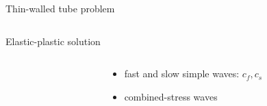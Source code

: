 \begin{frame}{Thin-walled tube problem}
\begin{columns}
\begin{column}{0.52\textwidth}
\begin{footnotesize}
\begin{block}{\footnotesize Elastic-\alert{plastic} solution \cite{CRISTESCU19591605,Rakhmatulin}}
\begin{columns}
\begin{column}{0.25\textwidth}
            \end{column}
            \begin{column}{0.7\textwidth}
              \begin{itemize}
              \item[] fast and slow simple waves: $c_f,c_s$
              \item[] combined-stress waves
              \end{itemize}
            \end{column}
          \end{columns}
        \end{block}
      \end{footnotesize}
    \end{column}
  \end{columns}
\end{frame}


